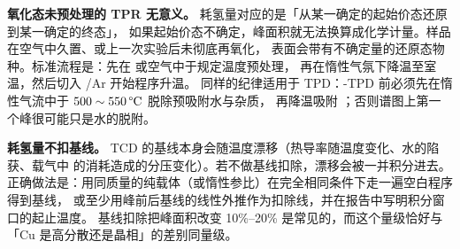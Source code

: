 \begin{pitfall}
\textbf{氧化态未预处理的 TPR 无意义。} 耗氢量对应的是「从某一确定的起始价态还原到某一确定的终态」，
如果起始价态不确定，峰面积就无法换算成化学计量。样品在空气中久置、或上一次实验后未彻底再氧化，
表面会带有不确定量的还原态物种。标准流程是：先在  或空气中于规定温度预处理，
再在惰性气氛下降温至室温，然后切入 /Ar 开始程序升温。
同样的纪律适用于 TPD：-TPD 前必须先在惰性气流中于 $500\sim550\,\degC$ 脱除预吸附水与杂质，
再降温吸附 ；否则谱图上第一个峰很可能只是水的脱附。

\textbf{耗氢量不扣基线。} TCD 的基线本身会随温度漂移（热导率随温度变化、水的陷获、载气中
 的消耗造成的分压变化）。若不做基线扣除，漂移会被一并积分进去。
正确做法是：用同质量的纯载体（或惰性参比）在完全相同条件下走一遍空白程序得到基线，
或至少用峰前后基线的线性外推作为扣除线，并在报告中写明积分窗口的起止温度。
基线扣除把峰面积改变 10\%--20\% 是常见的，而这个量级恰好与「Cu 是高分散还是晶相」的差别同量级。
\end{pitfall}

